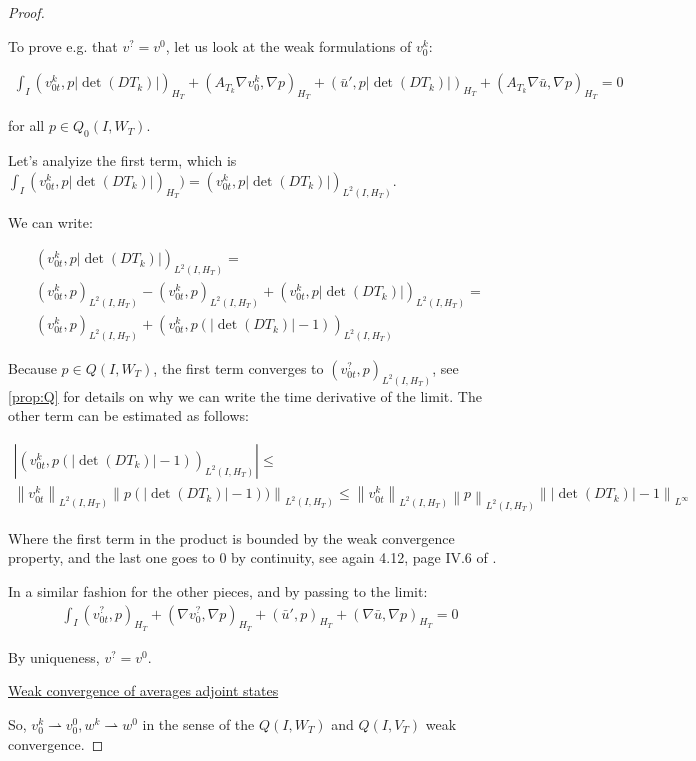 \documentclass[english,a4paper,10pt,oneside]{scrbook}	%
\theoremstyle{break}
\newenvironment{mproof}[1][\proofname]{%
  \begin{proof}[#1]$ $\par\nobreak\ignorespaces
}{%
  \end{proof}
}
\renewcommand*{\proofname}{Proof}
\theoremstyle{remark}
\newcommand{\norm}[1]{\left\lVert#1\right\rVert}
\newcommand{\weakc}{\rightharpoonup}
\begin{document}
\begin{mproof}
To prove e.g. that $v^?=v^0$, let us look at the weak formulations of $v_0^k$:

\begin{align*}
\int_I (v_{0t}^k,p |\det(DT_k)|)_{H_T} + (A_{T_k} \nabla v_0^k, \nabla p)_{H_T}+(\bar{u}',p|\det(DT_k)|)_{H_T}+(A_{T_k} \nabla \bar{u} , \nabla p)_{H_T} = 0
\end{align*}

for all $p \in Q_0(I,W_{T})$.

Let's analyize the first term, which is $\int_I (v_{0t}^k,p |\det(DT_k)|)_{H_T} ) =(v_{0t}^k,p |\det(DT_k)|)_{L^2(I,H_T)}$.

We can write:

\begin{align*}
(v_{0t}^k,p |\det(DT_k)|)_{L^2(I,H_T)} =\\ (v_{0t}^k,p )_{L^2(I,H_T)}- (v_{0t}^k,p )_{L^2(I,H_T)} + (v_{0t}^k,p |\det(DT_k)|)_{L^2(I,H_T)} =\\ (v_{0t}^k,p )_{L^2(I,H_T)} + (v_{0t}^k,p (|\det(DT_k)|-1))_{L^2(I,H_T)}
\end{align*}

Because $p \in  Q(I,W_{T})$, the first term converges to $(v_{0t}^?,p )_{L^2(I,H_T)}$, see \cref{prop:Q} for details on why we can write the time derivative of the limit. The other term can be estimated as follows:

\begin{align*}
|(v_{0t}^k,p (|\det(DT_k)|-1))_{L^2(I,H_T)}|\leq\\\norm{v_{0t}^k}_{L^2(I,H_T)}\norm{p (|\det(DT_k)|-1))}_{L^2(I,H_T)}\leq\norm{v_{0t}^k}_{L^2(I,H_T)}\norm{p }_{L^2(I,H_T)} \norm{|\det(DT_k)|-1}_{L^\infty}
\end{align*}

Where the first term in the product is bounded by the weak convergence property, and the last one goes to $0$ by continuity, see again 4.12, page IV.6 of \cite{murat}.

In a similar fashion for the other pieces, and by passing to the limit:
\begin{align*}
\int_I (v_{0t}^?,p)_{H_T} + (\nabla v_0^?, \nabla p)_{H_T}+(\bar{u}',p)_{H_T}+(\nabla \bar{u} , \nabla p)_{H_T} = 0
\end{align*}

By uniqueness, $v^?=v^0$.

\underline{Weak convergence of averages adjoint states}

So, $v_0^k \weakc v_0^0, w^k\weakc w^0$ in the sense of the $Q(I,W_T)$ and $Q(I,V_T)$ weak convergence.


\end{mproof}
\end{document}
